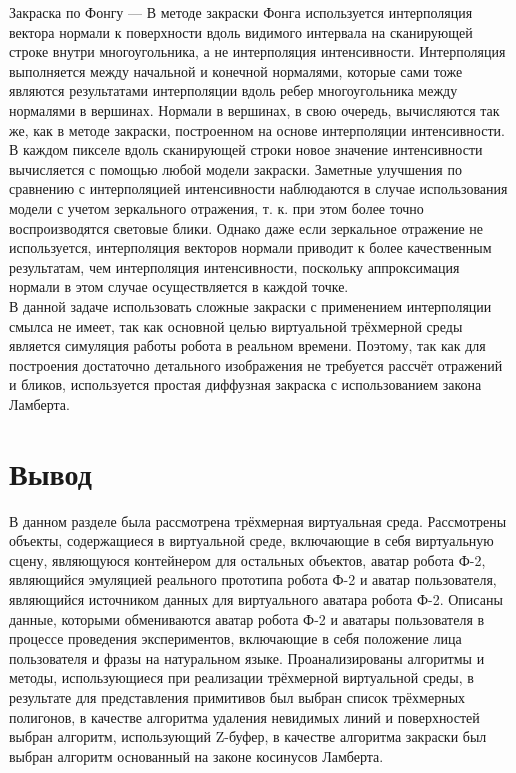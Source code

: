 Закраска по Фонгу — В методе закраски Фонга используется интерполяция вектора нормали к поверхности вдоль видимого интервала на сканирующей строке внутри многоугольника, а не интерполяция интенсивности. Интерполяция выполняется между начальной и конечной нормалями, которые сами тоже являются результатами интерполяции вдоль ребер многоугольника между нормалями в вершинах. Нормали в вершинах, в свою очередь, вычисляются так же, как в методе закраски, построенном на основе интерполяции интенсивности. В каждом пикселе вдоль сканирующей строки новое значение интенсивности вычисляется с помощью любой модели закраски. Заметные улучшения по сравнению с интерполяцией интенсивности наблюдаются в случае использования модели с учетом зеркального отражения, т. к. при этом более точно воспроизводятся световые блики. Однако даже если зеркальное отражение не используется, интерполяция векторов нормали приводит к более качественным результатам, чем интерполяция интенсивности, поскольку аппроксимация нормали в этом случае осуществляется в каждой точке. \cite{belcg}\\

В данной задаче использовать сложные закраски с применением интерполяции смылса не имеет, так как основной целью виртуальной трёхмерной среды является симуляция работы робота в реальном времени. Поэтому, так как для построения достаточно детального изображения не требуется рассчёт отражений и бликов, используется простая диффузная закраска с использованием закона Ламберта.

\section{Вывод}
В данном разделе была рассмотрена трёхмерная виртуальная среда. Рассмотрены объекты, содержащиеся в виртуальной среде, включающие в себя виртуальную сцену, являющуюся контейнером для остальных объектов, аватар робота Ф-2, являющийся эмуляцией реального прототипа робота Ф-2 и аватар пользователя, являющийся источником данных для виртуального аватара робота Ф-2. Описаны данные, которыми обмениваются аватар робота Ф-2 и аватары пользователя в процессе проведения экспериментов, включающие в себя положение лица пользователя и фразы на натуральном языке. Проанализированы алгоритмы и методы, использующиеся при реализации трёхмерной виртуальной среды, в результате для представления примитивов был выбран список трёхмерных полигонов, в качестве алгоритма удаления невидимых линий и поверхностей выбран алгоритм, использующий Z-буфер, в качестве алгоритма закраски был выбран алгоритм основанный на законе косинусов Ламберта.

